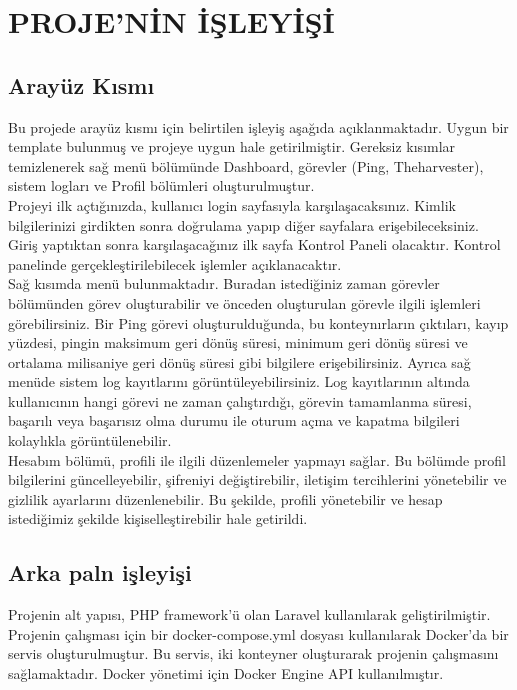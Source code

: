 \section{PROJE'NİN İŞLEYİŞİ}
\subsection{Arayüz Kısmı }
Bu projede arayüz kısmı için belirtilen işleyiş aşağıda açıklanmaktadır. Uygun bir template bulunmuş ve projeye uygun hale getirilmiştir. Gereksiz kısımlar temizlenerek sağ menü bölümünde Dashboard, görevler (Ping, Theharvester), sistem logları ve Profil bölümleri oluşturulmuştur.\\
Projeyi ilk açtığınızda, kullanıcı login sayfasıyla karşılaşacaksınız. Kimlik bilgilerinizi girdikten sonra doğrulama yapıp diğer sayfalara erişebileceksiniz. Giriş yaptıktan sonra karşılaşacağınız ilk sayfa Kontrol Paneli olacaktır. Kontrol panelinde gerçekleştirilebilecek işlemler açıklanacaktır.\\
Sağ kısımda menü bulunmaktadır. Buradan istediğiniz zaman görevler bölümünden görev oluşturabilir ve önceden oluşturulan görevle ilgili işlemleri görebilirsiniz. Bir Ping görevi oluşturulduğunda, bu konteynırların çıktıları, kayıp yüzdesi, pingin maksimum geri dönüş süresi, minimum geri dönüş süresi ve ortalama milisaniye geri dönüş süresi gibi bilgilere erişebilirsiniz. Ayrıca sağ menüde sistem log kayıtlarını görüntüleyebilirsiniz. Log kayıtlarının altında kullanıcının hangi görevi ne zaman çalıştırdığı, görevin tamamlanma süresi, başarılı veya başarısız olma durumu ile oturum açma ve kapatma bilgileri kolaylıkla görüntülenebilir.\\
Hesabım bölümü, profili ile ilgili düzenlemeler yapmayı sağlar. Bu bölümde profil bilgilerini güncelleyebilir, şifreniyi değiştirebilir, iletişim tercihlerini yönetebilir ve gizlilik ayarlarını düzenlenebilir. Bu şekilde, profili yönetebilir ve hesap istediğimiz  şekilde kişiselleştirebilir hale getirildi.
\subsection{Arka paln işleyişi}
Projenin alt yapısı, PHP framework'ü olan Laravel kullanılarak geliştirilmiştir. Projenin çalışması için bir docker-compose.yml dosyası kullanılarak Docker'da bir servis oluşturulmuştur. Bu servis, iki konteyner oluşturarak projenin çalışmasını sağlamaktadır. Docker yönetimi için Docker Engine API kullanılmıştır.

